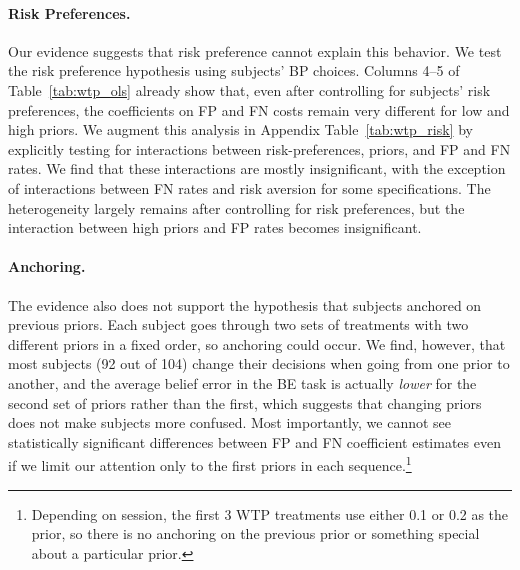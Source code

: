 \documentclass[12pt,a4paper]{article}
\begin{document}
\paragraph{Risk Preferences.} Our evidence suggests that risk preference cannot explain this behavior. We test the risk preference hypothesis using subjects' BP choices. Columns 4--5 of Table~\ref{tab:wtp_ols} already show that, even after controlling for subjects' risk preferences, the coefficients on FP and FN costs remain very different for low and high priors.
We augment this analysis in Appendix Table~\ref{tab:wtp_risk} by explicitly testing for interactions between risk-preferences, priors, and FP and FN rates. We find that these interactions are mostly insignificant, with the exception of interactions between FN rates and risk aversion for some specifications. The heterogeneity largely remains after controlling for risk preferences, but the interaction between high priors and FP rates becomes insignificant.

\paragraph{Anchoring.} The evidence also does not support the hypothesis that subjects anchored on previous priors. Each subject goes through two sets of treatments with two different priors in a fixed order, so anchoring could occur.  We find, however, that most subjects (92 out of 104) change their decisions when going from one prior to another, and the average belief error in the BE task is actually \emph{lower} for the second set of priors rather than the first, which suggests that changing priors does not make subjects more confused. Most importantly, we cannot see statistically significant differences between FP and FN coefficient estimates even if we limit our attention only to the first priors in each sequence.\footnote{Depending on session, the first 3 WTP treatments use either 0.1 or 0.2 as the prior, so there is no anchoring on the previous prior or something special about a particular prior.}
\end{document}
